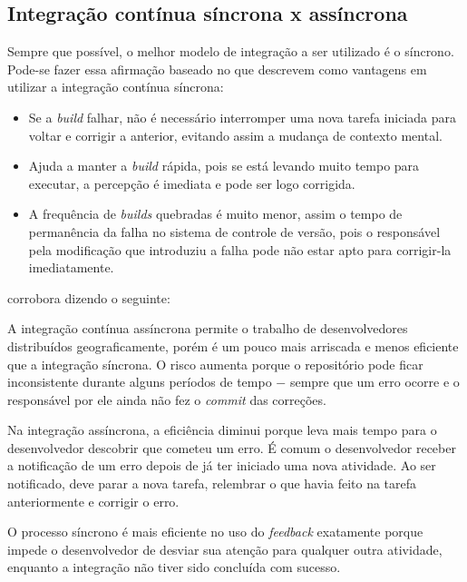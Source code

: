 
\subsection{Integração contínua síncrona x assíncrona} %
\label{sub:sincrona_x_assincrona}

Sempre que possível, o melhor modelo de integração a ser utilizado é o síncrono. Pode-se fazer essa afirmação baseado no que  descrevem como vantagens em utilizar a integração contínua síncrona:

\begin{itemize}
  \item Se a \textit{build} falhar, não é necessário interromper uma nova tarefa iniciada para voltar e corrigir a anterior, evitando assim a mudança de contexto mental.
  \item Ajuda a manter a \textit{build} rápida, pois se está levando muito tempo para executar, a percepção é imediata e pode ser logo corrigida.
  \item A frequência de \textit{builds} quebradas é muito menor, assim o tempo de permanência da falha no sistema de controle de versão, pois o responsável pela modificação que introduziu a falha pode não estar apto para corrigir-la imediatamente.
\end{itemize}

 corrobora dizendo o seguinte:

\begin{citacao}
A integração contínua assíncrona permite o trabalho de desenvolvedores distribuídos geograficamente, porém é um pouco mais arriscada e menos eficiente que a integração síncrona. O risco aumenta porque o repositório pode ficar inconsistente durante alguns períodos de tempo $-$ sempre que um erro ocorre e o responsável por ele ainda não fez o \textit{commit} das correções.

Na integração assíncrona, a eficiência diminui porque leva mais tempo para o desenvolvedor descobrir que cometeu um erro. É comum o desenvolvedor receber a notificação de um erro depois de já ter iniciado uma nova atividade. Ao ser notificado, deve parar a nova tarefa, relembrar o que havia feito na tarefa anteriormente e corrigir o erro.

O processo síncrono é mais eficiente no uso do \textit{feedback} exatamente porque impede o desenvolvedor de desviar sua atenção para qualquer outra atividade, enquanto a integração não tiver sido concluída com sucesso.
\end{citacao}

